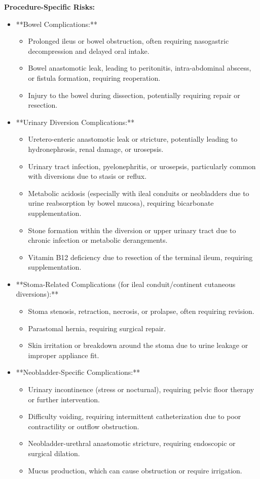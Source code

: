 \textbf{Procedure-Specific Risks:}
\begin{itemize}
  \item **Bowel Complications:**
    \begin{itemize}
      \item Prolonged ileus or bowel obstruction, often requiring nasogastric decompression and delayed oral intake.
      \item Bowel anastomotic leak, leading to peritonitis, intra-abdominal abscess, or fistula formation, requiring reoperation.
      \item Injury to the bowel during dissection, potentially requiring repair or resection.
    \end{itemize}
  
  \item **Urinary Diversion Complications:**
    \begin{itemize}
      \item Uretero-enteric anastomotic leak or stricture, potentially leading to hydronephrosis, renal damage, or urosepsis.
      \item Urinary tract infection, pyelonephritis, or urosepsis, particularly common with diversions due to stasis or reflux.
      \item Metabolic acidosis (especially with ileal conduits or neobladders due to urine reabsorption by bowel mucosa), requiring bicarbonate supplementation.
      \item Stone formation within the diversion or upper urinary tract due to chronic infection or metabolic derangements.
      \item Vitamin B12 deficiency due to resection of the terminal ileum, requiring supplementation.
    \end{itemize}
  
  \item **Stoma-Related Complications (for ileal conduit/continent cutaneous diversions):**
    \begin{itemize}
      \item Stoma stenosis, retraction, necrosis, or prolapse, often requiring revision.
      \item Parastomal hernia, requiring surgical repair.
      \item Skin irritation or breakdown around the stoma due to urine leakage or improper appliance fit.
    \end{itemize}
  
  \item **Neobladder-Specific Complications:**
    \begin{itemize}
      \item Urinary incontinence (stress or nocturnal), requiring pelvic floor therapy or further intervention.
      \item Difficulty voiding, requiring intermittent catheterization due to poor contractility or outflow obstruction.
      \item Neobladder-urethral anastomotic stricture, requiring endoscopic or surgical dilation.
      \item Mucus production, which can cause obstruction or require irrigation.
    \end{itemize}
  

\end{itemize}
